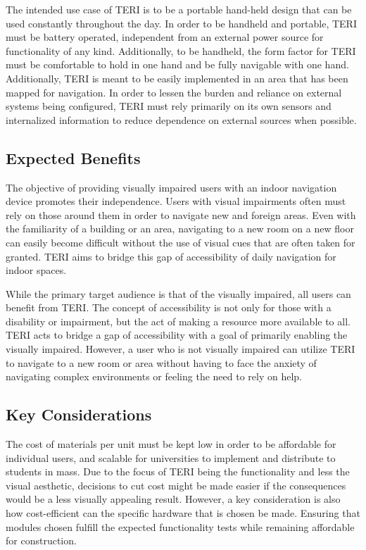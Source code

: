\documentclass{article}
\begin{document}
The intended use case of TERI is to be a portable hand-held design that can be used constantly throughout the day. In order to be handheld and portable, TERI must be battery operated, independent from an external power source for functionality of any kind. Additionally, to be handheld, the form factor for TERI must be comfortable to hold in one hand and be fully navigable with one hand. Additionally, TERI is meant to be easily implemented in an area that has been mapped for navigation. In order to lessen the burden and reliance on external systems being configured, TERI must rely primarily on its own sensors and internalized information to reduce dependence on external sources when possible.

\subsection{Expected Benefits}
The objective of providing visually impaired users with an indoor navigation device promotes their independence. Users with visual impairments often must rely on those around them in order to navigate new and foreign areas. Even with the familiarity of a building or an area, navigating to a new room on a new floor can easily become difficult without the use of visual cues that are often taken for granted. TERI aims to bridge this gap of accessibility of daily navigation for indoor spaces.

While the primary target audience is that of the visually impaired, all users can benefit from TERI. The concept of accessibility is not only for those with a disability or impairment, but the act of making a resource more available to all. TERI acts to bridge a gap of accessibility with a goal of primarily enabling the visually impaired. However, a user who is not visually impaired can utilize TERI to navigate to a new room or area without having to face the anxiety of navigating complex environments or feeling the need to rely on help.

\subsection{Key Considerations}
The cost of materials per unit must be kept low in order to be affordable for individual users, and scalable for universities to implement and distribute to students in mass. Due to the focus of TERI being the functionality and less the visual aesthetic, decisions to cut cost might be made easier if the consequences would be a less visually appealing result. However, a key consideration is also how cost-efficient can the specific hardware that is chosen be made. Ensuring that modules chosen fulfill the expected functionality tests while remaining affordable for construction.
\end{document}
